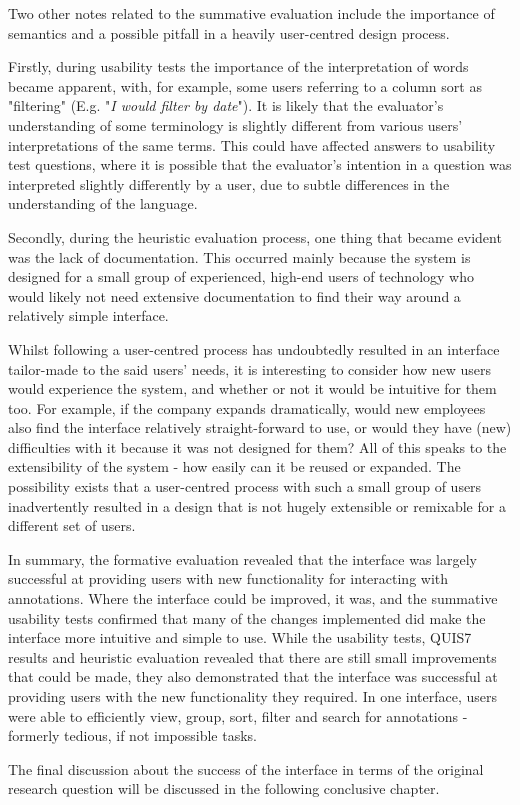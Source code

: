 Two other notes related to the summative evaluation include the importance of semantics and a possible pitfall in a heavily user-centred design process. 

Firstly, during usability tests the importance of the interpretation of words became apparent, with, for example, some users referring to a column sort as "filtering" (E.g. "\textit{I would filter by date}"). It is likely that the evaluator's understanding of some terminology is slightly different from various users' interpretations of the same terms. This could have affected answers to usability test questions, where it is possible that the evaluator's intention in a question was interpreted slightly differently by a user, due to subtle differences in the understanding of the language. 

Secondly, during the heuristic evaluation process, one thing that became evident was the lack of documentation. This occurred mainly because the system is designed for a small group of experienced, high-end users of technology who would likely not need extensive documentation to find their way around a relatively simple interface.  

Whilst following a user-centred process has undoubtedly resulted in an interface tailor-made to the said users' needs, it is interesting to consider how new users would experience the system, and whether or not it would be intuitive for them too. For example, if the company expands dramatically, would new employees also find the interface relatively straight-forward to use, or would they have (new) difficulties with it because it was not designed for them? All of this speaks to the extensibility of the system - how easily can it be reused or expanded. The possibility exists that a user-centred process with such a small group of users inadvertently resulted in a design that is not hugely extensible or remixable for a different set of users.

In summary, the formative evaluation revealed that the interface was largely successful at providing users with new functionality for interacting with annotations. Where the interface could be improved, it was, and the summative usability tests confirmed that many of the changes implemented did make the interface more intuitive and simple to use. While the usability tests, QUIS7 results and heuristic evaluation revealed that there are still small improvements that could be made, they also demonstrated that the interface was successful at providing users with the new functionality they required. In one interface, users were able to efficiently view, group, sort, filter and search for annotations - formerly tedious, if not impossible tasks. 

The final discussion about the success of the interface in terms of the original research question will be discussed in the following conclusive chapter. 

